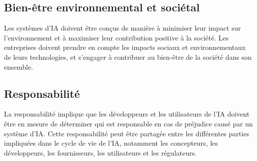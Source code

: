 \subsection{Bien-être environnemental et sociétal}
Les systèmes d'IA doivent être conçus de manière à minimiser leur impact sur l'environnement et à maximiser leur contribution positive à la société. Les entreprises doivent prendre en compte les impacts sociaux et environnementaux de leurs technologies, et s'engager à contribuer au bien-être de la société dans son ensemble. 
\newpage
\subsection{Responsabilité}
La responsabilité implique que les développeurs et les utilisateurs de l'IA doivent être en mesure de déterminer qui est responsable en cas de préjudice causé par un système d'IA. Cette responsabilité peut être partagée entre les différentes parties impliquées dans le cycle de vie de l'IA, notamment les concepteurs, les développeurs, les fournisseurs, les utilisateurs et les régulateurs.
